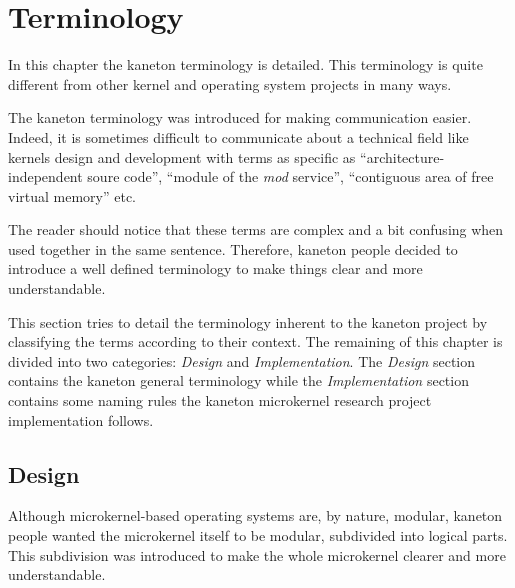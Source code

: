 %
%
%
%
%
%

%
%

\chapter{Terminology}
\label{chapter:terminology}

In this chapter the kaneton terminology is detailed. This terminology is
quite different from other kernel and operating system projects in many ways.

\newpage

%
%

The kaneton terminology was introduced for making communication easier.
Indeed, it is sometimes difficult to communicate about a technical
field like kernels design and development with terms as specific as
``architecture-independent soure code'', ``module of the \textit{mod}
service'', ``contiguous area of free virtual memory'' etc.

The reader should notice that these terms are complex and a bit confusing
when used together in the same sentence. Therefore, kaneton people decided to
introduce a well defined terminology to make things clear and more
understandable.

This section tries to detail the terminology inherent to the kaneton project
by classifying the terms according to their context. The remaining of
this chapter is divided into two categories: \textit{Design} and
\textit{Implementation}. The \textit{Design} section contains the kaneton
general terminology while the \textit{Implementation} section contains some
naming rules the kaneton microkernel research project implementation follows.

%
%

\section{Design}

Although microkernel-based operating systems are, by nature, modular, kaneton
people wanted the microkernel itself to be modular, subdivided into logical
parts. This subdivision was introduced to make the whole microkernel clearer
and more understandable.

